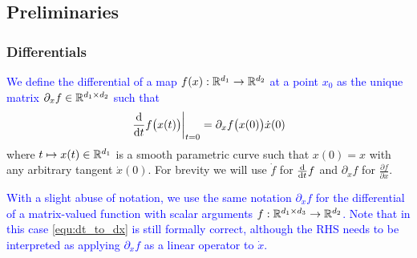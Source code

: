 \documentclass[10pt,twocolumn,twoside]{IEEEtran}
\newcommand{\new}[1]{\textcolor{blue}{#1}}
\begin{document}
\subsection{Preliminaries}
\subsubsection{Differentials}
\new{We define the differential of a map $f(x):\mathbb{R}^{d_1}{}\to\mathbb{R}^{d_2}{}$ at a point $x_0$ as the unique matrix $\partial_x f \in\mathbb{R}^{d_1\times d_2}{}$ such that}
\begin{equation}\label{equ:dt_to_dx}
  \left.\frac{\mathrm{d} }{\mathrm{d} t} f\bigl(x(t)\bigr)\right|_{t=0}=\partial_x f\bigl(x(0)\bigr) \dot{x}(0)
\end{equation}
where $t\mapsto x(t)\in\mathbb{R}^{d_1}{}$ is a smooth parametric curve such that $x(0)=x$ with any arbitrary tangent $\dot{x}(0)$. For brevity we will use $\dot f$ for $\frac{\mathrm{d} }{\mathrm{d} t} f$ and $\partial_x f$ for $\frac{\partial f}{\partial x}$. 

\new{With a slight abuse of notation, we use the same notation $\partial_xf$ for the differential of a matrix-valued function with scalar arguments $f:\mathbb{R}^{d_1 \times d_3}{}\to\mathbb{R}^{d_2}{}$.  Note that in this case \eqref{equ:dt_to_dx} is still formally correct, although the RHS needs to be interpreted as applying $\partial_x f$ as a linear operator to $\dot{x}$.}
\end{document}
